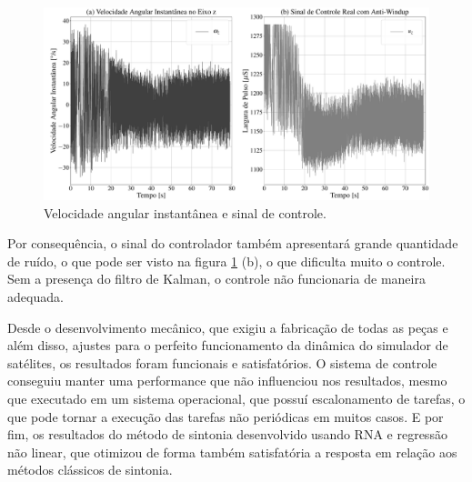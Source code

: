 \begin{figure}[H]
  \caption{Velocidade angular instantânea e sinal de controle.}
  \begin{center}
      \includegraphics[width=\textwidth]{resultados/img/pid_result_controller}
  \end{center}
  \label{fig:pid_result_controlller}
\end{figure}

Por consequência, o sinal do controlador também apresentará grande quantidade de ruído, o que pode ser visto na figura \ref{fig:pid_result_controlller} (b), o que dificulta muito o controle. Sem a presença do filtro de Kalman, o controle não funcionaria de maneira adequada.

Desde o desenvolvimento mecânico, que exigiu a fabricação de todas as peças e além disso, ajustes para o perfeito funcionamento da dinâmica do simulador de satélites, os resultados foram funcionais e satisfatórios. O sistema de controle conseguiu manter uma performance que não influenciou nos resultados, mesmo que executado em um sistema operacional, que possuí escalonamento de tarefas, o que pode tornar a execução das tarefas não periódicas em muitos casos. E por fim, os resultados do método de sintonia desenvolvido usando RNA e regressão não linear, que otimizou de forma também satisfatória a resposta em relação aos métodos clássicos de sintonia.
